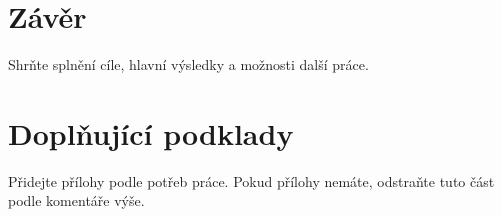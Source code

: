 \documentclass[FM,BP]{tulthesis}
\begin{document}

\chapter{Závěr}
Shrňte splnění cíle, hlavní výsledky a možnosti další práce.



\printbibliography[title={Použitá literatura},heading=bibintoc]


\appendix
\chapter{Doplňující podklady}
Přidejte přílohy podle potřeb práce. Pokud přílohy nemáte, odstraňte tuto část podle komentáře výše.

\end{document}
